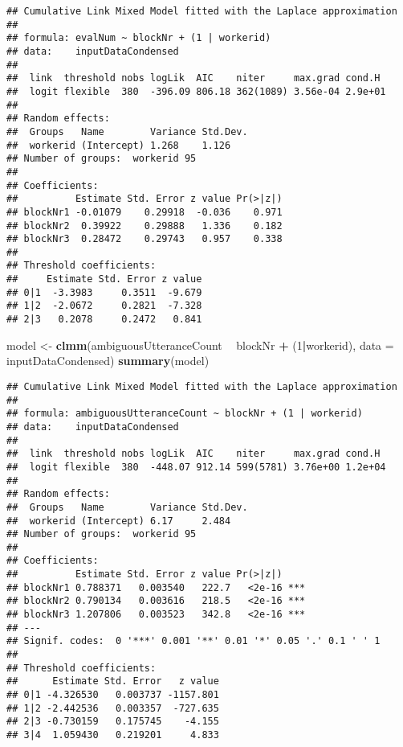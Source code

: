 \documentclass[]{article}
\newenvironment{Shaded}{\begin{snugshade}}{\end{snugshade}}
\newcommand{\DataTypeTok}[1]{\textcolor[rgb]{0.13,0.29,0.53}{#1}}
\newcommand{\DecValTok}[1]{\textcolor[rgb]{0.00,0.00,0.81}{#1}}
\newcommand{\KeywordTok}[1]{\textcolor[rgb]{0.13,0.29,0.53}{\textbf{#1}}}
\newcommand{\NormalTok}[1]{#1}
\newcommand{\OperatorTok}[1]{\textcolor[rgb]{0.81,0.36,0.00}{\textbf{#1}}}
\newcommand{\StringTok}[1]{\textcolor[rgb]{0.31,0.60,0.02}{#1}}
\begin{document}
\begin{verbatim}
## Cumulative Link Mixed Model fitted with the Laplace approximation
## 
## formula: evalNum ~ blockNr + (1 | workerid)
## data:    inputDataCondensed
## 
##  link  threshold nobs logLik  AIC    niter     max.grad cond.H 
##  logit flexible  380  -396.09 806.18 362(1089) 3.56e-04 2.9e+01
## 
## Random effects:
##  Groups   Name        Variance Std.Dev.
##  workerid (Intercept) 1.268    1.126   
## Number of groups:  workerid 95 
## 
## Coefficients:
##          Estimate Std. Error z value Pr(>|z|)
## blockNr1 -0.01079    0.29918  -0.036    0.971
## blockNr2  0.39922    0.29888   1.336    0.182
## blockNr3  0.28472    0.29743   0.957    0.338
## 
## Threshold coefficients:
##     Estimate Std. Error z value
## 0|1  -3.3983     0.3511  -9.679
## 1|2  -2.0672     0.2821  -7.328
## 2|3   0.2078     0.2472   0.841
\end{verbatim}

\begin{Shaded}
\begin{Highlighting}[]
\NormalTok{model <-}\StringTok{ }\KeywordTok{clmm}\NormalTok{(ambiguousUtteranceCount }\OperatorTok{~}\StringTok{ }\NormalTok{blockNr }\OperatorTok{+}\StringTok{ }\NormalTok{(}\DecValTok{1}\OperatorTok{|}\NormalTok{workerid), }\DataTypeTok{data =}\NormalTok{ inputDataCondensed)}
\KeywordTok{summary}\NormalTok{(model)}
\end{Highlighting}
\end{Shaded}

\begin{verbatim}
## Cumulative Link Mixed Model fitted with the Laplace approximation
## 
## formula: ambiguousUtteranceCount ~ blockNr + (1 | workerid)
## data:    inputDataCondensed
## 
##  link  threshold nobs logLik  AIC    niter     max.grad cond.H 
##  logit flexible  380  -448.07 912.14 599(5781) 3.76e+00 1.2e+04
## 
## Random effects:
##  Groups   Name        Variance Std.Dev.
##  workerid (Intercept) 6.17     2.484   
## Number of groups:  workerid 95 
## 
## Coefficients:
##          Estimate Std. Error z value Pr(>|z|)    
## blockNr1 0.788371   0.003540   222.7   <2e-16 ***
## blockNr2 0.790134   0.003616   218.5   <2e-16 ***
## blockNr3 1.207806   0.003523   342.8   <2e-16 ***
## ---
## Signif. codes:  0 '***' 0.001 '**' 0.01 '*' 0.05 '.' 0.1 ' ' 1
## 
## Threshold coefficients:
##      Estimate Std. Error   z value
## 0|1 -4.326530   0.003737 -1157.801
## 1|2 -2.442536   0.003357  -727.635
## 2|3 -0.730159   0.175745    -4.155
## 3|4  1.059430   0.219201     4.833
\end{verbatim}
\end{document}
